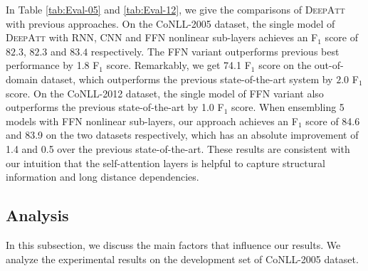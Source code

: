 \documentclass[letterpaper]{article} \usepackage{aaai18}  \usepackage{times}  \usepackage{helvet}  \usepackage{courier}  \usepackage{url}  \usepackage{graphicx}  \frenchspacing  \setlength{\pdfpagewidth}{8.5in}  \setlength{\pdfpageheight}{11in}  \usepackage{latexsym}
\begin{document}
In Table \ref{tab:Eval-05} and \ref{tab:Eval-12}, we give the comparisons of \textsc{DeepAtt} with previous approaches.  On the CoNLL-2005 dataset, the single model of \textsc{DeepAtt} with RNN, CNN and FFN nonlinear sub-layers achieves an F$_1$ score of $82.3$, $82.3$ and $83.4$ respectively. The FFN variant outperforms previous best performance by 1.8 F$_1$ score. Remarkably, we get 74.1 F$_1$ score on the out-of-domain dataset, which outperforms the previous state-of-the-art system by $2.0$ F$_1$ score. On the CoNLL-2012 dataset, the single model of FFN variant also outperforms the previous state-of-the-art by 1.0 F$_1$ score. When ensembling 5 models with FFN nonlinear sub-layers, our approach achieves an F$_1$ score of 84.6 and 83.9 on the two datasets respectively, which has an absolute improvement of 1.4 and 0.5 over the previous state-of-the-art. These results are consistent with our intuition that the self-attention layers is helpful to capture structural information and long distance dependencies.

\subsection{Analysis}
In this subsection, we discuss the main factors that influence our results. We analyze the experimental results on the development set of CoNLL-2005 dataset.

\begin{table}[htb]
\centering
{}
\caption{\label{tab:EXP-Group} Detailed results on the CoNLL-2005 development set. \textsc{PE} denotes the way to encoding word positions. GloVe refers to the GloVe embedding pre-trained on 6B tokens.}
\end{table}
\end{document}
